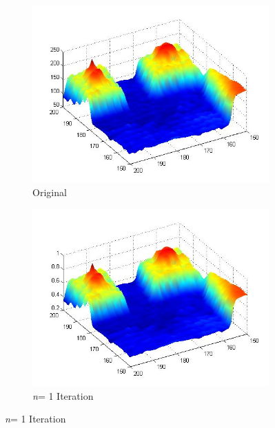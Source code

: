 \documentclass[a4paper, 10pt, conference] {article}
\begin{document}
 \begin{figure}[H]
 	\centering
 	\begin{subfigure}{0.29\textwidth} 						\includegraphics[scale=0.300]{mesh_original.JPG}
		\caption{Original}
	\end{subfigure}
	\begin{subfigure}{0.29\textwidth} 						\includegraphics[scale=0.300]{mesh_solution1.JPG}
		\caption{\textit{n}= 1 Iteration}
	\end{subfigure}

\end{figure}
\end{document}
